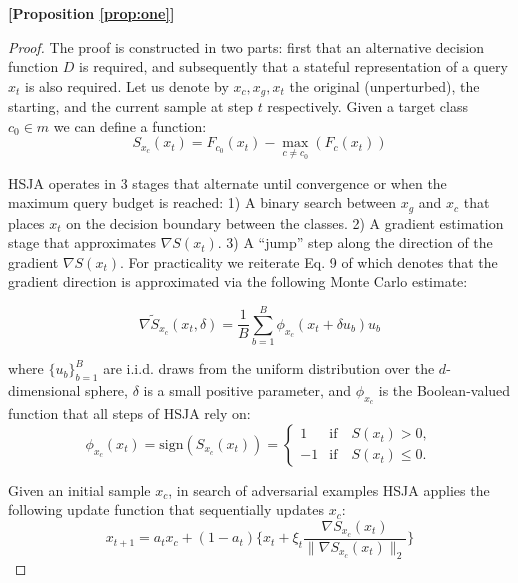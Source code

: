 \textbf{[Proposition \ref{prop:one}]}
\vspace{-1em}
\begin{proof}
The proof is constructed in two parts: first that an alternative decision function $D$ is required, and subsequently that a stateful representation of a query $x_t$ is also required.
Let us denote by $x_c, x_g, x_t$ the original (unperturbed), the starting, and the current sample at step $t$ respectively.
Given a target class $c_0 \in m$ we can define a function:
\begin{equation}
    S_{x_c}(x_t) = F_{c_0}(x_t) - \underset{c\neq c_0}{\max}(F_c(x_t))
\label{eqn:S}
\end{equation}

HSJA operates in 3 stages that alternate until convergence or when the maximum query budget is reached: 1) A binary search between $x_g$ and $x_c$ that places $x_t$ on the decision boundary between the classes. 2) A gradient estimation stage that approximates $\nabla S(x_t)$. 3) A ``jump'' step along the direction of the gradient $\nabla S(x_t)$. For practicality we reiterate Eq. 9 of \cite{chen2020hopskipjumpattack} which denotes that the gradient direction is approximated via the following Monte Carlo estimate:

\begin{equation}
    \widetilde{\nabla S_{x_c}}(x_t,\delta) = \frac{1}{B} \sum_{b=1}^{B} \phi_{x_c}(x_t + \delta u_b)u_b
\label{eqn:nabla}
\end{equation}

where $\{u_b\}_{b=1}^{B}$ are i.i.d. draws from the uniform distribution over the $d$-dimensional sphere, $\delta$ is a small positive parameter, and $\phi_{x_c}$ is the Boolean-valued function that all steps of HSJA rely on:
\begin{equation}
    \phi_{x_c}(x_t) = \text{sign}(S_{x_c}(x_t)) = 
    \begin{cases}
    1 & \text{if} \quad S(x_t) > 0,\\
    -1 & \text{if} \quad S(x_t) \leq 0.
    \end{cases}
\label{eqn:boolphi}
\end{equation}

Given an initial sample $x_c$, in search of adversarial examples HSJA applies the following update function that sequentially updates $x_c$:
\begin{equation}
    x_{t+1} = a_{t}x_c + (1-a_t)\Biggl\{x_t + \xi_t \frac{\nabla S_{x_c}(x_t)}{\|\nabla S_{x_c}(x_t)\|_2}\Biggl\}
\label{eqn:update}
\end{equation}


\end{proof}
